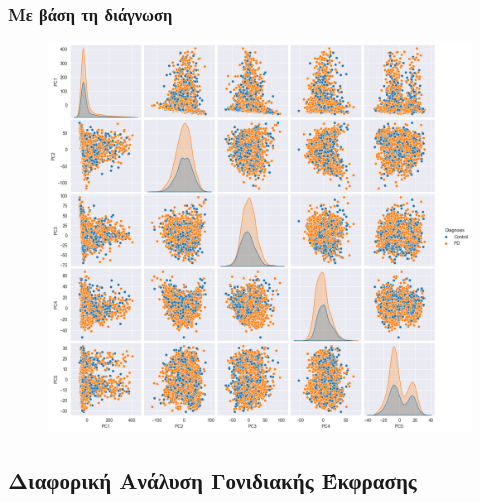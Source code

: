\documentclass[12pt]{report}
\begin{document}
            \subsubsection*{Με βάση τη διάγνωση}
                \begin{figure}[H]
                    \centering
                    \includegraphics[width=1\textwidth]{Chapter-2-Section-2.1/ppmi-pca-pd-ctrl-all-visits-hue_diagnosis.png}
                    \label{fig:app_pca_diagnosis}
                \end{figure}
        \subsection*{Διαφορική Ανάλυση Γονιδιακής Έκφρασης}
\end{document}
